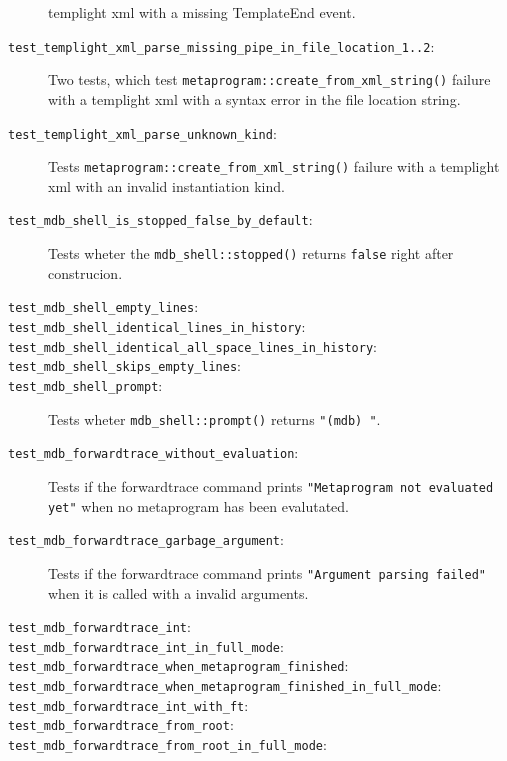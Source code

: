 \begin{description}
        templight xml with a missing TemplateEnd event.
    \item[\texttt{test\_templight\_xml\_parse\_missing\_pipe\_in\_file\_location\_1..2}:]
        Two tests, which test \texttt{metaprogram::create\_from\_xml\_string()}
        failure with a templight xml with a syntax error in the file location
        string.
    \item[\texttt{test\_templight\_xml\_parse\_unknown\_kind}:]
        Tests \texttt{metaprogram::create\_from\_xml\_string()} failure with a
        templight xml with an invalid instantiation kind.
    \item[\texttt{test\_mdb\_shell\_is\_stopped\_false\_by\_default}:]
        Tests wheter the \texttt{mdb\_shell::stopped()} returns \texttt{false}
        right after construcion.
    \item[\texttt{test\_mdb\_shell\_empty\_lines}:]
    \item[\texttt{test\_mdb\_shell\_identical\_lines\_in\_history}:]
    \item[\texttt{test\_mdb\_shell\_identical\_all\_space\_lines\_in\_history}:]
    \item[\texttt{test\_mdb\_shell\_skips\_empty\_lines}:]
    \item[\texttt{test\_mdb\_shell\_prompt}:]
        Tests wheter \texttt{mdb\_shell::prompt()} returns \texttt{"(mdb) "}.
    \item[\texttt{test\_mdb\_forwardtrace\_without\_evaluation}:]
        Tests if the forwardtrace command prints
        \texttt{"Metaprogram not evaluated yet"} when no metaprogram has been
        evalutated.
    \item[\texttt{test\_mdb\_forwardtrace\_garbage\_argument}:]
        Tests if the forwardtrace command prints
        \texttt{"Argument parsing failed"} when it is called with a invalid
        arguments.
    \item[\texttt{test\_mdb\_forwardtrace\_int}:]
    \item[\texttt{test\_mdb\_forwardtrace\_int\_in\_full\_mode}:]
    \item[\texttt{test\_mdb\_forwardtrace\_when\_metaprogram\_finished}:]
    \item[\texttt{test\_mdb\_forwardtrace\_when\_metaprogram\_finished\_in\_full\_mode}:]
    \item[\texttt{test\_mdb\_forwardtrace\_int\_with\_ft}:]
    \item[\texttt{test\_mdb\_forwardtrace\_from\_root}:]
    \item[\texttt{test\_mdb\_forwardtrace\_from\_root\_in\_full\_mode}:]

\end{description}
